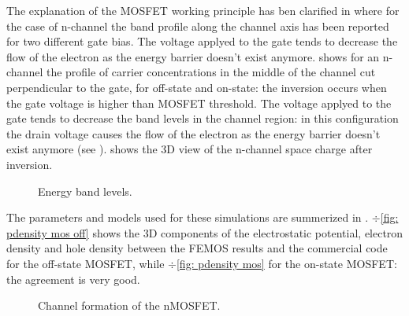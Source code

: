 The explanation of the MOSFET working principle has ben clarified in  where for the case of n-channel the band profile along the channel axis has been reported for two different gate bias.
The voltage applyed to the gate tends to decrease the flow of the electron as the energy barrier doesn't exist anymore.
 shows for an n-channel the profile of carrier concentrations in the middle of the channel cut perpendicular to the gate, for off-state and on-state: the inversion occurs when the gate voltage is higher than MOSFET threshold.
The voltage applyed to the gate tends to decrease the band levels in the channel region: in this configuration the drain voltage causes the flow of the electron as the energy barrier doesn't exist anymore (see ).
 shows the 3D view of the n-channel space charge after inversion.



\begin{figure}[!t]
\centering
{}
\caption{Energy band levels.}
\label{fig: energy levels MOS}
\end{figure}



The parameters and models used for these simulations are summerized in . $\div$\ref{fig: pdensity mos off} shows the 3D components of the electrostatic potential, electron density and hole density between the FEMOS results and the commercial code for the off-state MOSFET, while $\div$\ref{fig: pdensity mos} for the on-state MOSFET: the agreement is very good.


\begin{figure}[!b]
\centering
{}
\hspace{1cm}
\caption{Channel formation of the nMOSFET.}
\label{fig: channel figures}
\end{figure}



